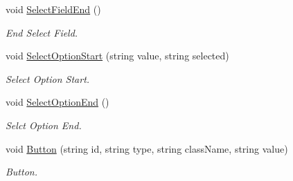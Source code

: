 \begin{DoxyCompactItemize}
void \hyperlink{classHTMLTags_adde967a90e03f4b5168b9bffd319980b}{Select\-Field\-End} ()
\begin{DoxyCompactList}\small\item\em End Select Field. \end{DoxyCompactList}\item 
void \hyperlink{classHTMLTags_a372570979ccc675e0ed752fe272e3cd6}{Select\-Option\-Start} (string value, string selected)
\begin{DoxyCompactList}\small\item\em Select Option Start. \end{DoxyCompactList}\item 
void \hyperlink{classHTMLTags_ae312980d20e3dea0469fdcb730fb975e}{Select\-Option\-End} ()
\begin{DoxyCompactList}\small\item\em Selct Option End. \end{DoxyCompactList}\item 
void \hyperlink{classHTMLTags_ab6dbb027d808e7b708a4ece7e911ceee}{Button} (string id, string type, string class\-Name, string value)
\begin{DoxyCompactList}\small\item\em Button. \end{DoxyCompactList}\end{DoxyCompactItemize}
